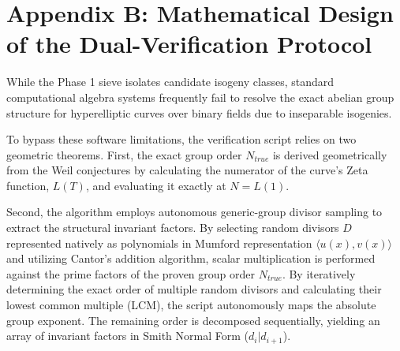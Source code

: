 \documentclass[12pt, letterpaper]{article}
\begin{document}
\section*{Appendix B: Mathematical Design of the Dual-Verification Protocol}
While the Phase 1 sieve isolates candidate isogeny classes, standard computational algebra systems frequently fail to resolve the exact abelian group structure for hyperelliptic curves over binary fields due to inseparable isogenies. 

To bypass these software limitations, the verification script relies on two geometric theorems. First, the exact group order $N_{true}$ is derived geometrically from the Weil conjectures by calculating the numerator of the curve's Zeta function, $L(T)$, and evaluating it exactly at $N = L(1)$. 

Second, the algorithm employs autonomous generic-group divisor sampling to extract the structural invariant factors. By selecting random divisors $D$ represented natively as polynomials in Mumford representation $\langle u(x), v(x) \rangle$ and utilizing Cantor's addition algorithm, scalar multiplication is performed against the prime factors of the proven group order $N_{true}$. By iteratively determining the exact order of multiple random divisors and calculating their lowest common multiple (LCM), the script autonomously maps the absolute group exponent. The remaining order is decomposed sequentially, yielding an array of invariant factors in Smith Normal Form ($d_i | d_{i+1}$).
\end{document}
